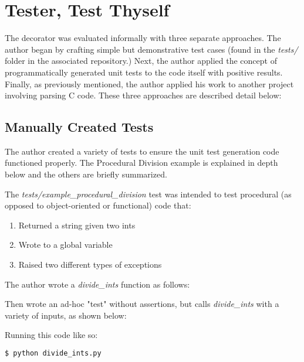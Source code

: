 \section{Tester, Test Thyself}\label{sec:evaluation}

The decorator was evaluated informally with three separate approaches.
The author began by crafting simple but demonstrative test cases 
(found in the \textit{tests/} folder in the associated repository.) Next,
the author applied the concept of programmatically generated unit tests
to the code itself with positive results.  Finally, as previously mentioned, 
the author applied his work to another project involving parsing C code. 
These three approaches are described detail below:

\subsection{Manually Created Tests}\label{sec:eval-1}
The author created a variety of tests to ensure the unit test generation 
code functioned properly. The Procedural Division example is explained in depth
below and the others are briefly summarized.

The \textit{tests/example\_procedural\_division} test was intended 
to test procedural (as opposed to object-oriented or functional) code that:  

\begin{enumerate}
    \item Returned a string given two ints
    \item Wrote to a global variable
    \item Raised two different types of exceptions
\end{enumerate}

The author wrote a \textit{divide\_ints} function as follows:



Then wrote an ad-hoc "test" without assertions, but calls 
\textit{divide\_ints} with a variety of inputs, as shown below:



Running this code like so:

\begin{lstlisting}[language=bash, caption={Executing example to create unit test}]
    $ python divide_ints.py
\end{lstlisting}
    
